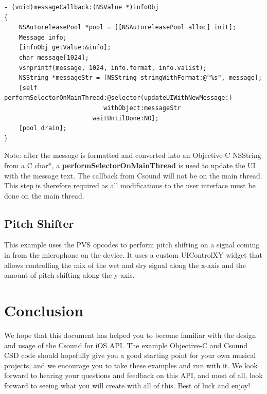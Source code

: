 \documentclass[11pt]{article}
\begin{document}
\begin{lstlisting}[caption=Message Callback Selector Code]
- (void)messageCallback:(NSValue *)infoObj
{
    NSAutoreleasePool *pool = [[NSAutoreleasePool alloc] init];
    Message info;
    [infoObj getValue:&info];
    char message[1024];
    vsnprintf(message, 1024, info.format, info.valist);
    NSString *messageStr = [NSString stringWithFormat:@"%s", message];
    [self performSelectorOnMainThread:@selector(updateUIWithNewMessage:)
                           withObject:messageStr
                        waitUntilDone:NO];
    [pool drain];
}
\end{lstlisting}

Note: after the message is formatted and converted into an Objective-C NSString from a C char*, a \textbf{performSelectorOnMainThread} is used to update the UI with the message text.  The callback from Csound will not be on the main thread. This step is therefore required as all modifications to the user interface must be done on the main thread. 

\subsection{Pitch Shifter}

This example uses the PVS opcodes to perform pitch shifting on a signal coming in from the microphone on the device.  It uses a custom UIControlXY widget that allows controlling the mix of the wet and dry signal along the x-axis and the amount of pitch shifting along the y-axis.  


\section{Conclusion}

We hope that this document has helped you to become familiar with the design and usage of the Csound for iOS API. The example Objective-C and Csound CSD code should hopefully give you a good starting point for your own musical projects, and we encourage you to take these examples and run with it.  We look forward to hearing your questions and feedback on this API, and most of all, look forward to seeing what you will create with all of this.  Best of luck and enjoy! 
\end{document}
